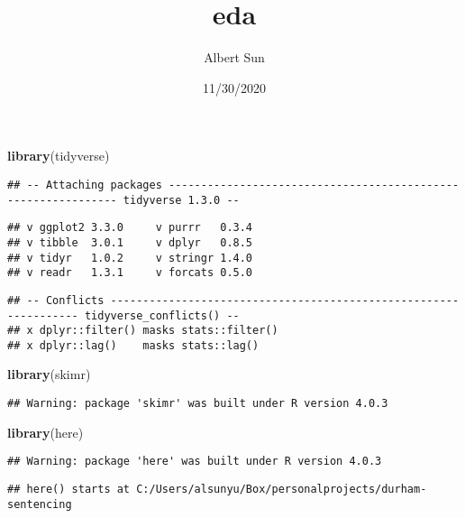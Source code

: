\documentclass[
]{article}
\title{eda}
\author{Albert Sun}
\date{11/30/2020}
\newenvironment{Shaded}{\begin{snugshade}}{\end{snugshade}}
\newcommand{\KeywordTok}[1]{\textcolor[rgb]{0.13,0.29,0.53}{\textbf{#1}}}
\newcommand{\NormalTok}[1]{#1}
\begin{document}
\maketitle

\begin{Shaded}
\begin{Highlighting}[]
\KeywordTok{library}\NormalTok{(tidyverse)}
\end{Highlighting}
\end{Shaded}

\begin{verbatim}
## -- Attaching packages -------------------------------------------------------------- tidyverse 1.3.0 --
\end{verbatim}

\begin{verbatim}
## v ggplot2 3.3.0     v purrr   0.3.4
## v tibble  3.0.1     v dplyr   0.8.5
## v tidyr   1.0.2     v stringr 1.4.0
## v readr   1.3.1     v forcats 0.5.0
\end{verbatim}

\begin{verbatim}
## -- Conflicts ----------------------------------------------------------------- tidyverse_conflicts() --
## x dplyr::filter() masks stats::filter()
## x dplyr::lag()    masks stats::lag()
\end{verbatim}

\begin{Shaded}
\begin{Highlighting}[]
\KeywordTok{library}\NormalTok{(skimr)}
\end{Highlighting}
\end{Shaded}

\begin{verbatim}
## Warning: package 'skimr' was built under R version 4.0.3
\end{verbatim}

\begin{Shaded}
\begin{Highlighting}[]
\KeywordTok{library}\NormalTok{(here)}
\end{Highlighting}
\end{Shaded}

\begin{verbatim}
## Warning: package 'here' was built under R version 4.0.3
\end{verbatim}

\begin{verbatim}
## here() starts at C:/Users/alsunyu/Box/personalprojects/durham-sentencing
\end{verbatim}
\end{document}
